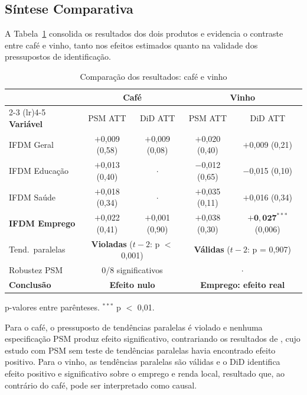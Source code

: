 \documentclass[12pt, a4paper]{article}
\begin{document}
\subsection{Síntese Comparativa}

A Tabela~\ref{tab:comparacao} consolida os resultados dos dois produtos e evidencia o contraste entre café e vinho, tanto nos efeitos estimados quanto na validade dos pressupostos de identificação.

\begin{table}[htbp]
\centering
\caption{Comparação dos resultados: café e vinho}
\label{tab:comparacao}
\small
\begin{threeparttable}
\begin{tabular}{lcccc}
\toprule
 & \multicolumn{2}{c}{\textbf{Café}} & \multicolumn{2}{c}{\textbf{Vinho}} \\
\cmidrule(lr){2-3} \cmidrule(lr){4-5}
\textbf{Variável} & PSM ATT & DiD ATT & PSM ATT & DiD ATT \\
\midrule
IFDM Geral            & $+$0,009 (0,58) & $+$0,009 (0,08) & $+$0,020 (0,40) & $+$0,009 (0,21) \\
IFDM Educação         & $+$0,013 (0,40) & $\cdot$         & $-$0,012 (0,65) & $-$0,015 (0,10) \\
IFDM Saúde            & $+$0,018 (0,34) & $\cdot$         & $+$0,035 (0,11) & $+$0,016 (0,34) \\
\textbf{IFDM Emprego} & $+$0,022 (0,41) & $+$0,001 (0,90) & $+$0,038 (0,30) & $\mathbf{+0{,}027^{***}}$ (0,006) \\
\midrule
Tend.\ paralelas & \multicolumn{2}{c}{\textbf{Violadas} ($t{-}2$: p $<$ 0,001)} & \multicolumn{2}{c}{\textbf{Válidas} ($t{-}2$: p = 0,907)} \\
Robustez PSM     & \multicolumn{2}{c}{0/8 significativos} & \multicolumn{2}{c}{$\cdot$} \\
\textbf{Conclusão} & \multicolumn{2}{c}{\textbf{Efeito nulo}} & \multicolumn{2}{c}{\textbf{Emprego: efeito real}} \\
\bottomrule
\end{tabular}
\begin{tablenotes}
\small
\item p-valores entre parênteses. $^{***}$ p $<$ 0,01.
\end{tablenotes}
\end{threeparttable}
\end{table}

Para o café, o pressuposto de tendências paralelas é violado e nenhuma especificação PSM produz efeito significativo, contrariando os resultados de \citet{medeiros2021raiher}, cujo estudo com PSM sem teste de tendências paralelas havia encontrado efeito positivo. Para o vinho, as tendências paralelas são válidas e o DiD identifica efeito positivo e significativo sobre o emprego e renda local, resultado que, ao contrário do café, pode ser interpretado como causal.
\end{document}
